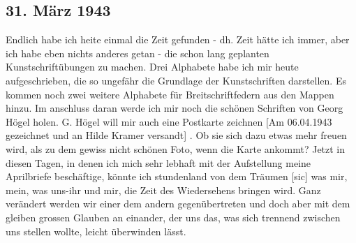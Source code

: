 \subsection{31. M\"{a}rz 1943}

Endlich habe ich heite einmal die Zeit gefunden - dh. Zeit h\"{a}tte ich immer, aber ich habe eben nichts anderes getan - die schon lang geplanten Kunstschrift\"{u}bungen zu machen.
Drei Alphabete habe ich mir heute aufgeschrieben, die so ungef\"{a}hr die Grundlage der Kunstschriften darstellen.
Es kommen noch zwei weitere Alphabete f\"{u}r Breitschriftfedern aus den Mappen hinzu.
Im anschluss daran werde ich mir noch die sch\"{o}nen Schriften von Georg H\"{o}gel holen.
G. H\"{o}gel will mir auch eine Postkarte zeichnen{\color{red} [Am 06.04.1943 gezeichnet und an Hilde Kramer versandt] }.
Ob sie sich dazu etwas mehr freuen wird, als zu dem gewiss nicht sch\"{o}nen Foto, wenn die Karte ankommt?
Jetzt in diesen Tagen, in denen ich mich sehr lebhaft mit der Aufstellung meine Aprilbriefe besch\"{a}ftige, k\"{o}nnte ich stundenland von dem Tr\"{a}umen{\color{red} [sic] } was mir, mein, was uns-ihr und mir, die Zeit des Wiedersehens bringen wird.
Ganz ver\"{a}ndert werden wir einer dem andern gegen\"{u}bertreten und doch aber mit dem gleiben grossen Glauben an einander, der uns das, was sich trennend zwischen uns stellen wollte, leicht \"{u}berwinden l\"{a}sst.

\clearpage
